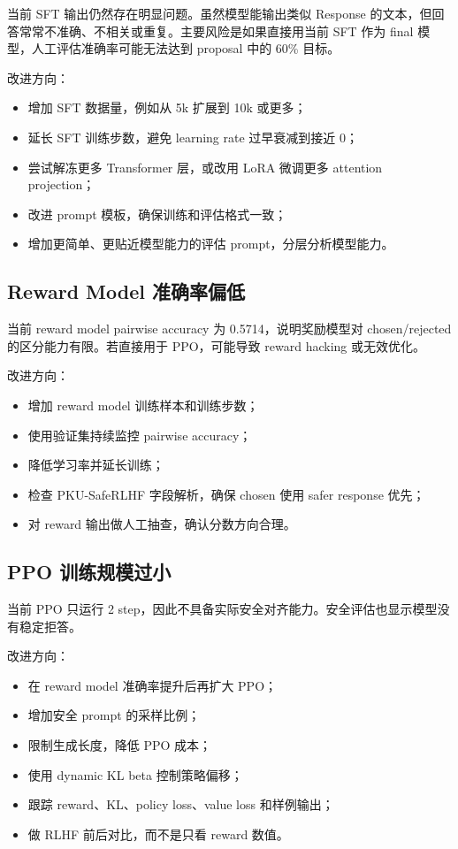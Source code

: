 \documentclass[UTF8,zihao=-4]{ctexart}
\begin{document}
当前 SFT 输出仍然存在明显问题。虽然模型能输出类似 Response 的文本，但回答常常不准确、不相关或重复。主要风险是如果直接用当前 SFT 作为 final 模型，人工评估准确率可能无法达到 proposal 中的 60\% 目标。

改进方向：

\begin{itemize}
  \item 增加 SFT 数据量，例如从 5k 扩展到 10k 或更多；
  \item 延长 SFT 训练步数，避免 learning rate 过早衰减到接近 0；
  \item 尝试解冻更多 Transformer 层，或改用 LoRA 微调更多 attention projection；
  \item 改进 prompt 模板，确保训练和评估格式一致；
  \item 增加更简单、更贴近模型能力的评估 prompt，分层分析模型能力。
\end{itemize}

\subsection{Reward Model 准确率偏低}

当前 reward model pairwise accuracy 为 0.5714，说明奖励模型对 chosen/rejected 的区分能力有限。若直接用于 PPO，可能导致 reward hacking 或无效优化。

改进方向：

\begin{itemize}
  \item 增加 reward model 训练样本和训练步数；
  \item 使用验证集持续监控 pairwise accuracy；
  \item 降低学习率并延长训练；
  \item 检查 PKU-SafeRLHF 字段解析，确保 chosen 使用 safer response 优先；
  \item 对 reward 输出做人工抽查，确认分数方向合理。
\end{itemize}

\subsection{PPO 训练规模过小}

当前 PPO 只运行 2 step，因此不具备实际安全对齐能力。安全评估也显示模型没有稳定拒答。

改进方向：

\begin{itemize}
  \item 在 reward model 准确率提升后再扩大 PPO；
  \item 增加安全 prompt 的采样比例；
  \item 限制生成长度，降低 PPO 成本；
  \item 使用 dynamic KL beta 控制策略偏移；
  \item 跟踪 reward、KL、policy loss、value loss 和样例输出；
  \item 做 RLHF 前后对比，而不是只看 reward 数值。
\end{itemize}
\end{document}
